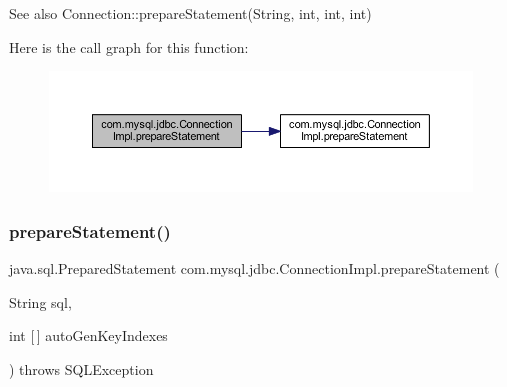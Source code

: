 \begin{DoxySeeAlso}{See also}
Connection\+::prepare\+Statement(\+String, int, int, int) 
\end{DoxySeeAlso}
Here is the call graph for this function\+:\nopagebreak
\begin{figure}[H]
\begin{center}
\leavevmode
\includegraphics[width=350pt]{classcom_1_1mysql_1_1jdbc_1_1_connection_impl_af7e71a40722d396ca129cf1b4483e0a9_cgraph}
\end{center}
\end{figure}
\mbox{\label{classcom_1_1mysql_1_1jdbc_1_1_connection_impl_a16bfd377059377ad90fe6ea2a3e2edc8}} 
\subsubsection{\texorpdfstring{prepare\+Statement()}{prepareStatement()}\hspace{0.1cm}{\footnotesize\ttfamily [5/6]}}
{\footnotesize\ttfamily java.\+sql.\+Prepared\+Statement com.\+mysql.\+jdbc.\+Connection\+Impl.\+prepare\+Statement (\begin{DoxyParamCaption}\item[{String}]{sql,  }\item[{int \mbox{[}$\,$\mbox{]}}]{auto\+Gen\+Key\+Indexes }\end{DoxyParamCaption}) throws S\+Q\+L\+Exception}

